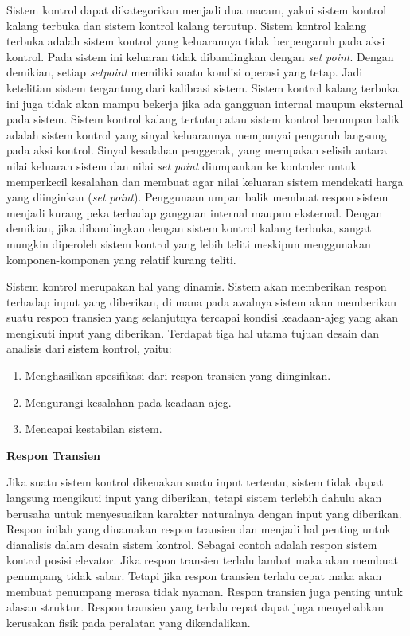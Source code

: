 Sistem kontrol dapat dikategorikan menjadi dua macam, yakni sistem kontrol kalang terbuka dan sistem kontrol kalang tertutup. Sistem kontrol kalang terbuka adalah sistem kontrol yang keluarannya tidak berpengaruh pada aksi kontrol. Pada sistem ini keluaran tidak dibandingkan dengan \textit{set point}. Dengan demikian, setiap \textit{setpoint} memiliki suatu kondisi operasi yang tetap. Jadi ketelitian sistem tergantung dari kalibrasi sistem. Sistem kontrol kalang terbuka ini juga tidak akan mampu bekerja jika ada gangguan internal maupun eksternal pada sistem. Sistem kontrol kalang tertutup atau sistem kontrol berumpan balik adalah sistem kontrol yang sinyal keluarannya mempunyai pengaruh langsung pada aksi kontrol. Sinyal kesalahan penggerak, yang merupakan selisih antara nilai keluaran sistem dan nilai \textit{set point} diumpankan ke kontroler untuk memperkecil kesalahan dan membuat agar nilai keluaran sistem mendekati harga yang diinginkan (\textit{set point}). Penggunaan umpan balik membuat respon sistem menjadi kurang peka terhadap gangguan internal maupun eksternal. Dengan demikian, jika dibandingkan dengan sistem kontrol kalang terbuka, sangat mungkin diperoleh sistem kontrol yang lebih teliti meskipun menggunakan komponen-komponen yang relatif kurang teliti. \cite{ControlSystemBook}

Sistem kontrol merupakan hal yang dinamis. Sistem akan memberikan respon terhadap input yang diberikan, di mana pada awalnya sistem akan memberikan suatu respon transien yang selanjutnya tercapai kondisi keadaan-ajeg yang akan mengikuti input yang diberikan. Terdapat tiga hal utama tujuan desain dan analisis dari sistem kontrol, yaitu: \cite{ControlSystemBook}
\begin{enumerate}
	\item Menghasilkan spesifikasi dari respon transien yang diinginkan.
	\item Mengurangi kesalahan pada keadaan-ajeg.
	\item Mencapai kestabilan sistem.
\end{enumerate}

\noindent \textbf{Respon Transien}

Jika suatu sistem kontrol dikenakan suatu input tertentu, sistem tidak dapat langsung mengikuti input yang diberikan, tetapi sistem terlebih dahulu akan berusaha untuk menyesuaikan karakter naturalnya dengan input yang diberikan. Respon inilah yang dinamakan respon transien dan menjadi hal penting untuk dianalisis dalam desain sistem kontrol. Sebagai contoh adalah respon sistem kontrol posisi elevator. Jika respon transien terlalu lambat maka akan membuat penumpang tidak sabar. Tetapi jika respon transien terlalu cepat maka akan membuat penumpang merasa tidak nyaman. Respon transien juga penting untuk alasan struktur. Respon transien yang terlalu cepat dapat juga menyebabkan kerusakan fisik pada peralatan yang dikendalikan.\cite{ControlSystemBook} \\

